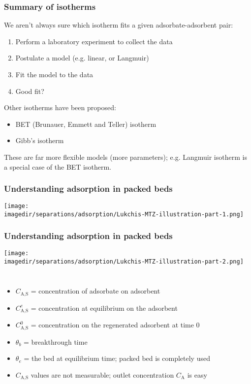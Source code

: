 \begin{frame}\frametitle{Summary of isotherms}
	We aren't always sure which isotherm fits a given adsorbate-adsorbent pair:
	\begin{enumerate}
		\item	Perform a laboratory experiment to collect the data
		\item	Postulate a model (e.g. linear, or Langmuir)
		\item	Fit the model to the data
		\item	Good fit? 
	\end{enumerate}
	
	\vspace{24pt}
	Other isotherms have been proposed:
	\begin{itemize}
		\item	BET (Brunauer, Emmett and Teller) isotherm
		\item	Gibb's isotherm
	\end{itemize}
	
	These are far more flexible models (more parameters); e.g. Langmuir isotherm is a special case of the BET isotherm.
\end{frame}

\begin{frame}\frametitle{Understanding adsorption in packed beds}
	\begin{center}
		\texttt{[image: \\imagedir/separations/adsorption/Lukchis-MTZ-illustration-part-1.png]}
	\end{center}
\end{frame}

\begin{frame}\frametitle{Understanding adsorption in packed beds}
	\begin{center}
		\texttt{[image: \\imagedir/separations/adsorption/Lukchis-MTZ-illustration-part-2.png]}
	\end{center}
	\vspace{-16pt}
	\vspace{-18pt}
	\begin{columns}[t]
			\begin{itemize}
				\item	{\small $C_\text{A,S}$ = concentration of adsorbate on adsorbent}
				\item	{\small $C_\text{A,S}^e$ = concentration at equilibrium on the adsorbent}
				\item	{\small $C_\text{A,S}^0$ = concentration on the regenerated adsorbent at time 0}
				\item	{\small $\theta_b$ = breakthrough time}
				\item	{\small $\theta_e$ = the bed at equilibrium time; packed bed is completely used}
				\item	{\small $C_\text{A,S}$ values are not measurable; outlet concentration $C_\text{A}$ is easy}
			\end{itemize}
	\end{columns}	
\end{frame}

